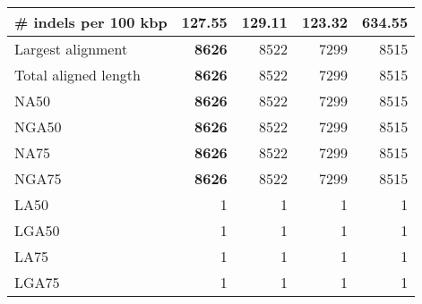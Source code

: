 \documentclass[12pt,a4paper]{article}
\begin{document}
\begin{table}[ht]
\begin{center}
\begin{tabular}{|l*{4}{|r}|}
\# indels per 100 kbp & 127.55 & 129.11 & {\bf 123.32} & 634.55 \\ \hline
Largest alignment & {\bf 8626} & 8522 & 7299 & 8515 \\ \hline
Total aligned length & {\bf 8626} & 8522 & 7299 & 8515 \\ \hline
NA50 & {\bf 8626} & 8522 & 7299 & 8515 \\ \hline
NGA50 & {\bf 8626} & 8522 & 7299 & 8515 \\ \hline
NA75 & {\bf 8626} & 8522 & 7299 & 8515 \\ \hline
NGA75 & {\bf 8626} & 8522 & 7299 & 8515 \\ \hline
LA50 & 1 & 1 & 1 & 1 \\ \hline
LGA50 & 1 & 1 & 1 & 1 \\ \hline
LA75 & 1 & 1 & 1 & 1 \\ \hline
LGA75 & 1 & 1 & 1 & 1 \\ \hline
\end{tabular}
\end{center}
\end{table}
\end{document}
